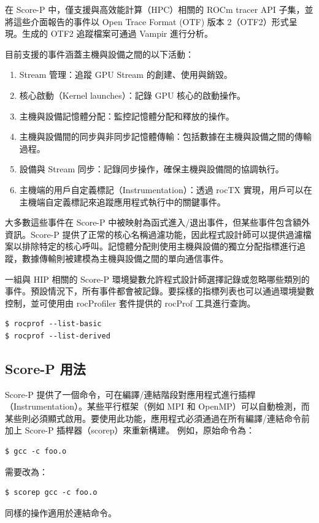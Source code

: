 在 Score-P 中，僅支援與高效能計算（HPC）相關的 ROCm tracer API 子集，並將這些介面報告的事件以 Open Trace Format (OTF) 版本 2（OTF2）形式呈現。生成的 OTF2 追蹤檔案可通過 Vampir 進行分析。

目前支援的事件涵蓋主機與設備之間的以下活動：

\begin{enumerate}
    \item Stream 管理：追蹤 GPU Stream 的創建、使用與銷毀。
    \item 核心啟動（Kernel launches）：記錄 GPU 核心的啟動操作。
    \item 主機與設備記憶體分配：監控記憶體分配和釋放的操作。
    \item 主機與設備間的同步與非同步記憶體傳輸：包括數據在主機與設備之間的傳輸過程。
    \item 設備與 Stream 同步：記錄同步操作，確保主機與設備間的協調執行。
    \item 主機端的用戶自定義標記（Instrumentation）：透過 rocTX 實現，用戶可以在主機端自定義標記來追蹤應用程式執行中的關鍵事件。
\end{enumerate}



大多數這些事件在 Score-P 中被映射為函式進入/退出事件，但某些事件包含額外資訊。Score-P 提供了正常的核心名稱過濾功能，因此程式設計師可以提供過濾檔案以排除特定的核心呼叫。記憶體分配則使用主機與設備的獨立分配指標進行追蹤，數據傳輸則被建模為主機與設備之間的單向通信事件。

一組與 HIP 相關的 Score-P 環境變數允許程式設計師選擇記錄或忽略哪些類別的事件。預設情況下，所有事件都會被記錄。要採樣的指標列表也可以通過環境變數控制，並可使用由 rocProfiler 套件提供的 rocProf 工具進行查詢。

\begin{lstlisting}
$ rocprof --list-basic
$ rocprof --list-derived
\end{lstlisting}

\subsection{Score-P 用法}


Score-P 提供了一個命令，可在編譯/連結階段對應用程式進行插桿（Instrumentation）。某些平行框架（例如 MPI 和 OpenMP）可以自動檢測，而某些則必須顯式啟用。要使用此功能，應用程式必須通過在所有編譯/連結命令前加上 Score-P 插桿器（scorep）來重新構建。
例如，原始命令為：
\begin{lstlisting}
$ gcc -c foo.o
\end{lstlisting}
需要改為：
\begin{lstlisting}
$ scorep gcc -c foo.o
\end{lstlisting}
同樣的操作適用於連結命令。

